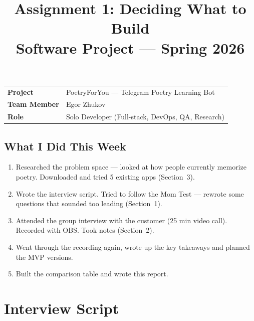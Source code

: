 \documentclass[11pt, a4paper]{article}
\title{\textbf{Assignment 1: Deciding What to Build}\\[0.5em]
\large Software Project --- Spring 2026}
\author{}
\date{}
\begin{document}
\maketitle
\thispagestyle{empty}


\begin{center}
\begin{tabular}{ll}
\toprule
\textbf{Project} & PoetryForYou --- Telegram Poetry Learning Bot \\
\textbf{Team Member} & Egor Zhukov \\
\textbf{Role} & Solo Developer (Full-stack, DevOps, QA, Research) \\
\bottomrule
\end{tabular}
\end{center}

\subsection*{What I Did This Week}
\begin{enumerate}
    \item Researched the problem space --- looked at how people currently memorize poetry. Downloaded and tried 5 existing apps (Section~3).
    \item Wrote the interview script. Tried to follow the Mom Test --- rewrote some questions that sounded too leading (Section~1).
    \item Attended the group interview with the customer (25 min video call). Recorded with OBS. Took notes (Section~2).
    \item Went through the recording again, wrote up the key takeaways and planned the MVP versions.
    \item Built the comparison table and wrote this report.
\end{enumerate}

\vspace{1em}


\section{Interview Script}
\end{document}
